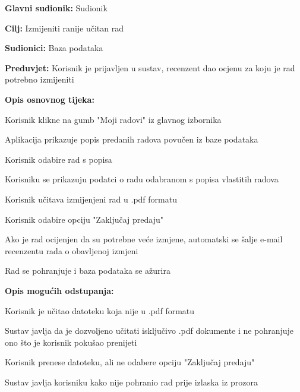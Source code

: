 					\noindent {}
					\begin{packed_item}
						\item \textbf{Glavni sudionik:} Sudionik
						\item \textbf{Cilj:} Izmijeniti ranije učitan rad
						\item \textbf{Sudionici:} Baza podataka
						\item \textbf{Preduvjet:} Korisnik je prijavljen u sustav, recenzent dao ocjenu za koju je rad potrebno izmijeniti
						
						\item \textbf{Opis osnovnog tijeka:} 
						\item[] \begin{packed_enum}
							
							
							\item Korisnik klikne na gumb "Moji radovi" iz glavnog izbornika
							\item Aplikacija prikazuje popis predanih radova povučen iz baze podataka
							\item Korisnik odabire rad s popisa 
							\item  Korisniku se prikazuju podatci o radu odabranom s popisa vlastitih radova
							\item Korisnik učitava izmijenjeni rad u .pdf formatu
							\item Korisnik odabire opciju "Zaključaj predaju"
							\item Ako je rad ocijenjen da su potrebne veće izmjene, automatski se šalje e-mail recenzentu rada o obavljenoj izmjeni
							\item Rad se pohranjuje i baza podataka se ažurira
						\end{packed_enum}
						
						\item \textbf{Opis mogućih odstupanja:}
						\item[] \begin{packed_enum}
							\item[5.a] Korisnik je učitao datoteku koja nije u .pdf formatu
							\item[] \begin{packed_enum}
								\item[1.] Sustav javlja da je dozvoljeno učitati isključivo .pdf dokumente i ne pohranjuje ono što je korisnik pokušao prenijeti
							\end{packed_enum}
							
							\item[6.a] Korisnik prenese datoteku, ali ne odabere opciju "Zaključaj predaju"
							\item[] \begin{packed_enum}
								\item[1.] Sustav javlja korisniku kako nije pohranio rad prije izlaska iz prozora
							\end{packed_enum}
							
						\end{packed_enum}
					\end{packed_item}
					
